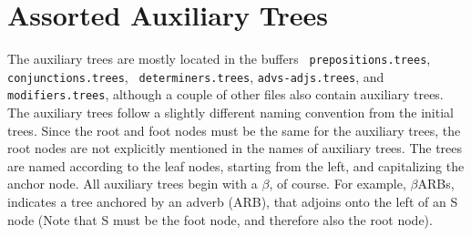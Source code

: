 \section{Assorted Auxiliary Trees}

The auxiliary trees are mostly located in the buffers {\tt
prepositions.trees}, {\tt conjunctions.trees}, {\tt
determiners.trees}, {\tt advs-adjs.trees}, and {\tt modifiers.trees},
although a couple of other files also contain auxiliary trees.  The
auxiliary trees follow a slightly different naming convention from the
initial trees.  Since the root and foot nodes must be the same for the
auxiliary trees, the root nodes are not explicitly mentioned in the
names of auxiliary trees.  The trees are named according to the leaf
nodes, starting from the left, and capitalizing the anchor node.  All
auxiliary trees begin with a $\beta$, of course.  For example,
$\beta$ARBs, indicates a tree anchored by an adverb (ARB), that
adjoins onto the left of an S node (Note that S must be the foot node,
and therefore also the root node).


